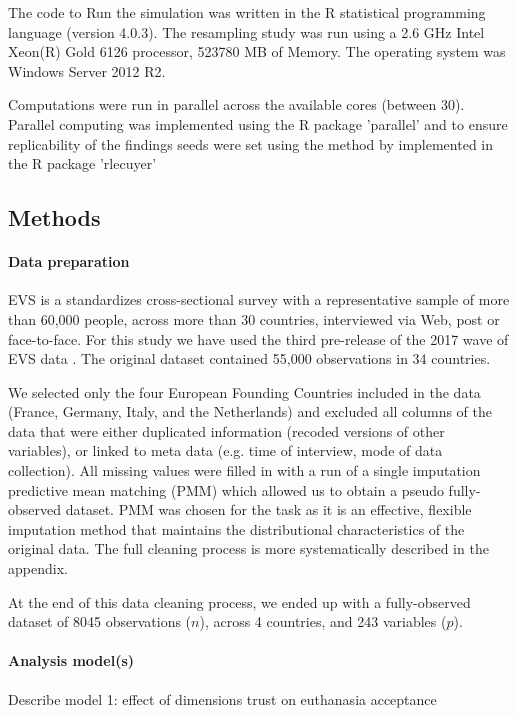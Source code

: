 	The code to Run the simulation was written in the R statistical programming language (version 4.0.3). 
	The resampling study was run using a 2.6 GHz Intel Xeon(R) Gold 6126 processor, 523780 MB of Memory. The
	operating system was Windows Server 2012 R2.

	Computations were run in parallel across the available cores (between 30). Parallel computing 
	was implemented using the R package 'parallel' and to ensure replicability of the findings seeds were
	set using the method by \cite{lecuyer:2002} implemented in the R package 'rlecuyer'

\subsection{Methods}

\paragraph{Data preparation}
	EVS is a standardizes cross-sectional survey with a representative sample of more than 60,000 
	people, across more than 30 countries, interviewed via Web, post or face-to-face.
	For this study we have used the third pre-release of the 2017 wave of EVS data \citep{EVS:2017}.
	The original dataset contained 55,000 observations in 34 countries.

	We selected only the four European Founding Countries included in the data (France, Germany,
	Italy, and the Netherlands) and excluded all columns of the data that were either duplicated
	information (recoded versions of other variables), or linked to meta data (e.g. time of interview,
	mode of data collection). 
	All missing values were filled in with a run of a single imputation predictive mean matching (PMM) 
	which allowed us to obtain a pseudo fully-observed dataset. PMM was chosen for the task as it 
	is an effective, flexible imputation method that maintains the distributional characteristics of 
	the original data. 
	The full cleaning process is more systematically described in the appendix.

	At the end of this data cleaning process, we ended up with a fully-observed dataset
	of 8045 observations ($n$), across 4 countries, and 243 variables ($p$).

\paragraph{Analysis model(s)}
	Describe model 1: effect of dimensions trust on euthanasia acceptance

